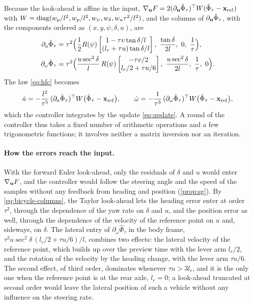 Because the look-ahead is affine in the input,
$\nabla_{\mathbf{u}}F = 2(\partial_{\mathbf{u}}\hat\Phi_\tau)^\top W(\hat\Phi_\tau - \mathbf{x}_{\mathrm{ref}})$ with
$W = \operatorname{diag}(w_p/l^2, w_p/l^2, w_\psi, w_\delta, w_u\tau^2/l^2)$, and the columns of
$\partial_{\mathbf{u}}\hat\Phi_\tau$, with the components ordered as $(x,y,\psi,\delta,u)$, are
\begin{equation}\label{eq:bicycle-columns}
\begin{aligned}
    \partial_a\hat\Phi_\tau &= \tau^2\Bigl(
        \frac12 R(\psi)\begin{bmatrix} 1 - \tau v\tan\delta/l \\ (l_r + \tau u)\tan\delta/l \end{bmatrix},\
        \frac{\tan\delta}{2l},\ 0,\ \frac{1}{\tau}\Bigr), \\
    \partial_\omega\hat\Phi_\tau &= \tau^2\Bigl(
        \frac{u\sec^2\delta}{l}\,R(\psi)\begin{bmatrix} -\tau v/2 \\ l_r/2 + \tau u/6 \end{bmatrix},\
        \frac{u\sec^2\delta}{2l},\ \frac{1}{\tau},\ 0\Bigr).
\end{aligned}
\end{equation}
The \method{} law \eqref{eq:hfc} becomes
\begin{equation}\label{eq:bicycle-law}
    \dot a = -\frac{l^2}{\tau^5}\,(\partial_a\hat\Phi_\tau)^\top W\bigl(\hat\Phi_\tau - \mathbf{x}_{\mathrm{ref}}\bigr),
    \qquad
    \dot\omega = -\frac{1}{\tau^3}\,(\partial_\omega\hat\Phi_\tau)^\top W\bigl(\hat\Phi_\tau - \mathbf{x}_{\mathrm{ref}}\bigr),
\end{equation}
which the controller integrates by the update \eqref{eq:update}.
A round of the controller thus takes a fixed number of arithmetic operations and a few
trigonometric functions; it involves neither a matrix inversion nor an iteration.

\paragraph{How the errors reach the input.}
With the forward Euler look-ahead, only the residuals of $\delta$ and $u$ would enter
$\nabla_{\mathbf{u}}F$, and the controller would follow the steering angle and the speed of the samples
without any feedback from heading and position (\cref{prop:sg}).
By \eqref{eq:bicycle-columns}, the Taylor look-ahead lets the heading error enter at order $\tau^2$,
through the dependence of the yaw rate on $\delta$ and $u$, and the position error as well, through
the dependence of the velocity of the reference point on $u$ and, sideways, on $\delta$.
The lateral entry of $\partial_\omega\hat\Phi_\tau$ in the body frame,
$\tau^2 u\sec^2\delta\,(l_r/2 + \tau u/6)/l$, combines two effects: the lateral velocity of the
reference point, which builds up over the preview time with the lever arm $l_r/2$, and the rotation of
the velocity by the heading change, with the lever arm $\tau u/6$.
The second effect, of third order, dominates whenever $\tau u > 3l_r$, and it is the only one when the
reference point is at the rear axle, $l_r = 0$; a look-ahead truncated at second order would leave
the lateral position of such a vehicle without any influence on the steering rate.

